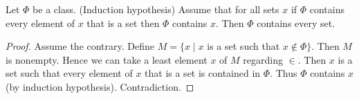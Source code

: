 \documentclass[../../set-theory/set-theory.tex]{subfiles}
\begin{document}
  \begin{forthel}
    \begin{proposition}
      Let $\Phi$ be a class.
      (Induction hypothesis) Assume that for all sets $x$ if $\Phi$ contains
      every element of $x$ that is a set then $\Phi$ contains $x$.
      Then $\Phi$ contains every set.
    \end{proposition}
    \begin{proof}
      Assume the contrary.
      Define $M = \{ x \mid x$ is a set such that $x \notin \Phi \}$.
      Then $M$ is nonempty.
      Hence we can take a least element $x$ of $M$ regarding ${\in}$.
      Then $x$ is a set such that every element of $x$ that is a set is
      contained in $\Phi$.
      Thus $\Phi$ contains $x$ (by induction hypothesis).
      Contradiction.
    \end{proof}
  \end{forthel}
\end{document}
